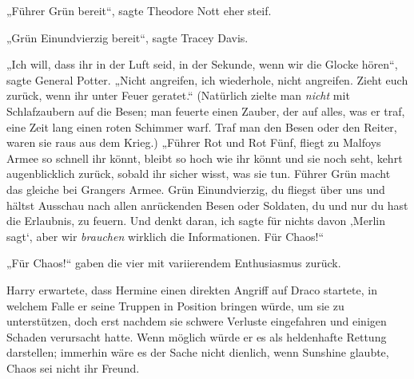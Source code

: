 „Führer Grün bereit“, sagte Theodore Nott eher steif.

„Grün Einundvierzig bereit“, sagte Tracey Davis.

„Ich will, dass ihr in der Luft seid, in der Sekunde, wenn wir die Glocke hören“, sagte General Potter.
„Nicht angreifen, ich wiederhole, nicht angreifen. Zieht euch zurück, wenn ihr unter Feuer geratet.“ (Natürlich zielte man \emph{nicht} mit Schlafzaubern auf die Besen; man feuerte einen Zauber, der auf alles, was er traf, eine Zeit lang einen roten Schimmer warf. Traf man den Besen oder den Reiter, waren sie raus aus dem Krieg.)
„Führer Rot und Rot Fünf, fliegt zu Malfoys Armee so schnell ihr könnt, bleibt so hoch wie ihr könnt und sie noch seht, kehrt augenblicklich zurück, sobald ihr sicher wisst, was sie tun. Führer Grün macht das gleiche bei Grangers Armee. Grün Einundvierzig, du fliegst über uns und hältst Ausschau nach allen anrückenden Besen oder Soldaten, du und nur du hast die Erlaubnis, zu feuern. Und denkt daran, ich sagte für nichts davon ‚Merlin sagt‘, aber wir \emph{brauchen} wirklich die Informationen. Für Chaos!“

„Für Chaos!“ gaben die vier mit variierendem Enthusiasmus zurück.

Harry erwartete, dass Hermine einen direkten Angriff auf Draco startete, in welchem Falle er seine Truppen in Position bringen würde, um sie zu unterstützen, doch erst nachdem sie schwere Verluste eingefahren und einigen Schaden verursacht hatte. Wenn möglich würde er es als heldenhafte Rettung darstellen; immerhin wäre es der Sache nicht dienlich, wenn Sunshine glaubte, Chaos sei nicht ihr Freund.

